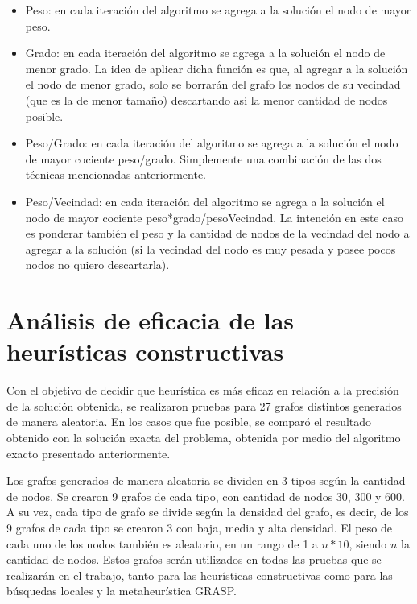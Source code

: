 \documentclass[a4paper,11pt] {article}
\begin{document}
\begin{itemize}
\item Peso: en cada iteraci\'on del algoritmo se agrega a la soluci\'on el nodo de mayor peso.
\item Grado: en cada iteraci\'on del algoritmo se agrega a la soluci\'on el nodo de menor grado. La idea de aplicar dicha funci\'on es que, al agregar a la soluci\'on el nodo de menor grado, solo se borrar\'an del grafo los nodos de su vecindad (que es la de menor tama\~{n}o) descartando asi la menor cantidad de nodos posible.
\item Peso/Grado: en cada iteraci\'on del algoritmo se agrega a la soluci\'on el nodo de mayor cociente peso/grado. Simplemente una combinaci\'on de las dos t\'ecnicas mencionadas anteriormente.
\item Peso/Vecindad: en cada iteraci\'on del algoritmo se agrega a la soluci\'on el nodo de mayor cociente peso*grado/pesoVecindad. La intenci\'on en este caso es ponderar tambi\'en el peso y la cantidad de nodos de la vecindad del nodo a agregar a la soluci\'on (si la vecindad del nodo es muy pesada y posee pocos nodos no quiero descartarla).
\end{itemize}

\section*{An\'alisis de eficacia de las heur\'isticas constructivas}

Con el objetivo de decidir que heur\'istica es m\'as eficaz en relaci\'on a la precisi\'on de la soluci\'on obtenida, se realizaron pruebas para 27 grafos distintos generados de manera aleatoria. En los casos que fue posible, se compar\'o el resultado obtenido con la soluci\'on exacta del problema, obtenida por medio del algoritmo exacto presentado anteriormente.

Los grafos generados de manera aleatoria se dividen en 3 tipos seg\'un la cantidad de nodos. Se crearon 9 grafos de cada tipo, con cantidad de nodos 30, 300 y 600. A su vez, cada tipo de grafo se divide seg\'un la densidad del grafo, es decir, de los 9 grafos de cada tipo se crearon 3 con baja, media y alta densidad. El peso de cada uno de los nodos tambi\'en es aleatorio, en un rango de 1 a $n*10$, siendo $n$ la cantidad de nodos. Estos grafos ser\'an utilizados en todas las pruebas que se realizar\'an en el trabajo, tanto para las heur\'isticas constructivas como para las b\'usquedas locales y la metaheur\'istica GRASP.\footnotemark[1]
\end{document}
